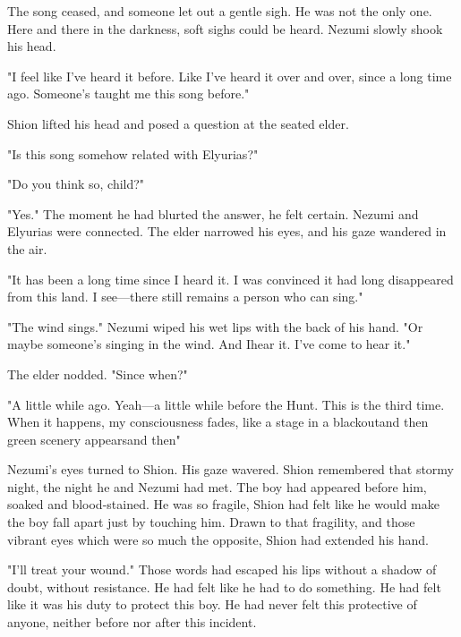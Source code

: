
The song ceased, and someone let out a gentle sigh. He was not the only
one. Here and there in the darkness, soft sighs could be heard. Nezumi
slowly shook his head.

"I feel like I've heard it before. Like I've heard it over and over,
since a long time ago. Someone's taught me this song before."

Shion lifted his head and posed a question at the seated elder.

"Is this song somehow related with Elyurias?"

"Do you think so, child?"

"Yes." The moment he had blurted the answer, he felt certain. Nezumi and
Elyurias were connected. The elder narrowed his eyes, and his gaze
wandered in the air.

"It has been a long time since I heard it. I was convinced it had long
disappeared from this land. I see---there still remains a person who can
sing."

"The wind sings." Nezumi wiped his wet lips with the back of his hand.
"Or maybe someone's singing in the wind. And I\el hear it. I've come to
hear it."

The elder nodded. "Since when?"

"A little while ago. Yeah---a little while before the Hunt. This is the
third time. When it happens, my consciousness fades, like a stage in a
blackout\el and then green scenery appears\el and then\el "

Nezumi's eyes turned to Shion. His gaze wavered. Shion remembered that
stormy night, the night he and Nezumi had met. The boy had appeared
before him, soaked and blood-stained. He was so fragile, Shion had felt
like he would make the boy fall apart just by touching him. Drawn to
that fragility, and those vibrant eyes which were so much the opposite,
Shion had extended his hand.

"I'll treat your wound." Those words had escaped his lips without a
shadow of doubt, without resistance. He had felt like he had to do
something. He had felt like it was his duty to protect this boy. He had
never felt this protective of anyone, neither before nor after this
incident.

